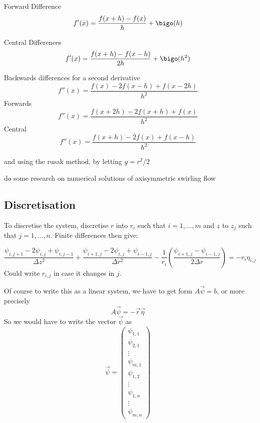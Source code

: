 \documentclass{X:/Documents/Coding/Latex/myreport}
\begin{document}
Forward Difference
\[f'(x) = \frac{f(x+h) - f(x)}{h}+ \bigo(h)\]

Central Differences
\[f'(x) = \frac{f(x+h) - f(x-h)}{2h}+ \bigo(h^2)\]

Backwards differences for a second derivative
\[f''(x) = \frac{f(x) - 2f(x-h) + f(x-2h)}{h^2}\]
Forwards
\[f''(x) = \frac{f(x+2h) - 2f(x+h) + f(x)}{h^2}\]
Central 
\[f''(x) = \frac{f(x+h) - 2 f(x) + f(x-h)}{h^2}\]











and using the rusak method, by letting $y = r^2/2$


do some research on numerical solutions of axisymmetric swirling flow 



\subsection{Discretisation}

To discretise the system, discretise $r$ into $r_i$ such that $i=1,\ldots,m$ and $z$ to $z_j$ such that $j=1,\ldots,n$.
Finite differences then give:

\[\frac{\psi_{i,j+1} - 2 \psi_{i,j} + \psi_{i,j-1}}{\Delta z^2} + \frac{\psi_{i+1,j} - 2 \psi_{i,j} + \psi_{i-1,j}}{\Delta r^2} - \frac1{r_i} \left( \frac{\psi_{i+1,j} - \psi_{i-1,j}}{2 \Delta r}\right) = - r_i \eta_{i,j}\]
Could write $r_{i,j}$ in case it changes in $j$.


Of course to write this as a linear system, we have to get form $A\vec \psi = b $, or more precisely
\[A\vec{\psi} = -\vec r\vec\eta\] 
So we would have to write the vector $\vec \psi$ as 
\[\vec \psi = \begin{pmatrix}
    \psi_{1,1}\\
    \psi_{2,1}\\
    \vdots\\
    \psi_{m,1}\\
    \psi_{1,2}\\
    \vdots\\
    \psi_{1,n}\\
    \vdots\\
    \psi_{m,n}
\end{pmatrix}\]
\end{document}
